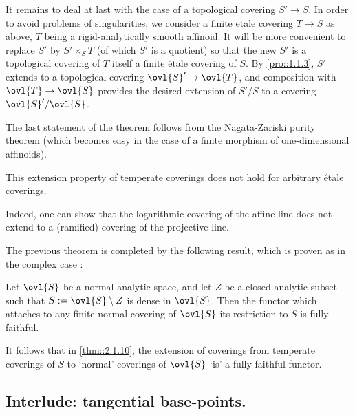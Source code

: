 It remains to deal at last with the case of a topological covering
$S'\to S$.  In order to avoid problems of singularities, we consider a finite 
etale covering $T\to S$ as above, $T$ being a rigid-analytically 
smooth affinoid.  It will be more convenient to replace $S'$ by 
$S'\times_S T$ (of which $S'$ is a quotient) so that the new $S'$ is 
a topological covering of $T$ 
itself a finite \'etale covering of $S$.
By \ref{pro::1.1.3}, $S'$ extends to a topological covering $\ovl{S}'
\to\ovl{T}$, and composition with $\ovl{T}\to \ovl{S}$ provides the 
desired extension of $S'/S$ to a covering $\ovl{S}'/\ovl{S}$.
 
The last statement of the theorem follows from the Nagata-Zariski purity
theorem (which becomes easy in the case of a finite morphism of
one-dimensional affinoids).

\medskip{} This extension property of temperate
coverings does not hold for arbitrary \'etale coverings. 

\noindent Indeed, one can show that the logarithmic covering of the
affine line does not extend to a (ramified) covering 
of the projective line.

\medskip The previous theorem is completed by the following result,
which is proven as in the complex case \cite[exp. XII, 5.3]{sga1}:

\begin{pro}\label{pro::2.1.12} Let $\ovl{S}$ be a normal analytic space,
 and let $Z$ be a closed analytic subset such that $S:=\ovl{S}\setminus
 Z$ is dense in $\ovl{S}$. Then the functor which attaches to any finite
 normal covering of $\ovl{S}$ its restriction to $S$ is fully faithful.
\end{pro}

It follows that in \ref{thm::2.1.10}, the extension of coverings from temperate
coverings of $S$ to `normal' coverings of $\ovl{S}$ `is' a fully
faithful functor.

\subsection{Interlude: tangential base-points.}\label{sub::2.2}

